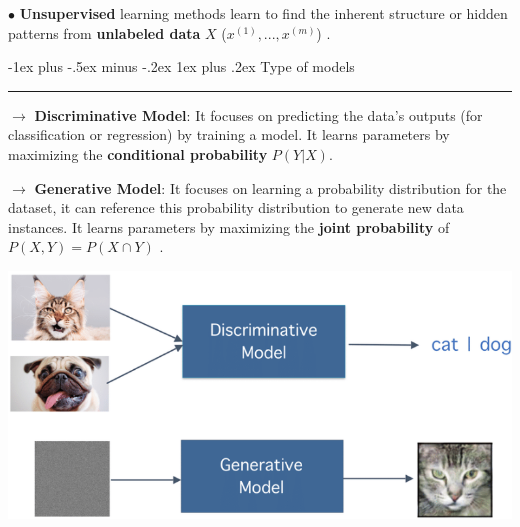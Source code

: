 \documentclass[letterpaper, 10.5pt,landscape]{article}
\makeatletter
\renewcommand{\subsubsection}{\@startsection{subsubsection}{3}{0mm}%
                                {-1ex plus -.5ex minus -.2ex}%
                                {1ex plus .2ex}%
                                {\normalfont\small\bfseries}}
\makeatother
\begin{document}
\begin{multicols*}{3}
\vspace{3pt}
$\bullet$ \textbf{Unsupervised} learning methods learn to find the inherent structure or hidden patterns from \textbf{unlabeled data} 
 $X$ (\(x^{(1)}, ..., x^{(m)}\)) . 


\subsubsection{Type of models} {\color{teal}\hrule height 0.5pt} \smallskip

$\rightarrow$ \textbf{Discriminative Model}: It focuses on predicting the data's outputs (for classification or regression) by training a model. It learns parameters by maximizing the \textbf{conditional probability} $P(Y|X)$.

\vspace{2pt}

$\rightarrow$ \textbf{Generative Model}: It focuses on learning a probability distribution for the dataset, it can reference this probability distribution to generate new data instances. It learns parameters by maximizing the \textbf{joint probability} of $P(X, Y) = P(X \cap Y)$ .
\vspace{-5pt}

\vspace{-5pt}
\begin{center}
    \begin{minipage}{0.8\linewidth}
    \includegraphics[width=\textwidth]{figures/Discriminant_Generative_Illustration.PNG}
    \end{minipage}
\end{center}
\vspace{-7pt}





\vspace{-7pt}




\end{multicols*}
\end{document}
